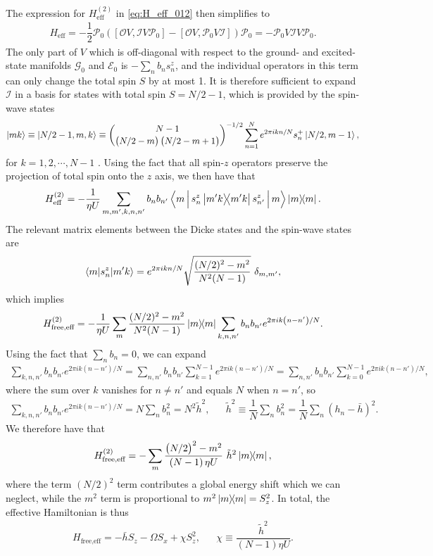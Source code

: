 \documentclass[aps,notitlepage,nofootinbib,11pt]{revtex4-1}
\renewcommand{\t}{\text} %
\newcommand{\f}[2]{\dfrac{#1}{#2}} %
\newcommand{\p}[1]{\left(#1\right)} %
\renewcommand{\sp}[1]{\left[#1\right]} %
\newcommand{\bk}{\braket} %
\newcommand{\Bk}{\Braket} %
\newcommand{\E}{\mathcal{E}}
\newcommand{\G}{\mathcal{G}}
\newcommand{\I}{\mathcal{I}}
\renewcommand{\O}{\mathcal{O}}
\renewcommand{\P}{\mathcal{P}}
\newcommand{\1}{\mathds{1}}
\begin{document}
The expression for $H_{\t{eff}}^{(2)}$ in \eqref{eq:H_eff_012} then
simplifies to
\begin{align}
  H_{\t{eff}}
  = -\f12 \P_0 \p{\sp{\O V, \I V \P_0} - \sp{\O V, \P_0 V \I}} \P_0
  = -\P_0 V \I V \P_0.
\end{align}
The only part of $V$ which is off-diagonal with respect to the ground-
and excited-state manifolds $\G_0$ and $\E_0$ is $-\sum_nb_ns_n^z$,
and the individual operators in this term can only change the total
spin $S$ by at most 1.  It is therefore sufficient to expand $\I$ in a
basis for states with total spin $S=N/2-1$, which is provided by the
spin-wave states
\begin{align}
  \ket{mk}
  \equiv \ket{N/2-1,m,k}
  \equiv {N-1 \choose \p{N/2-m}\p{N/2-m+1}}^{-1/2}
  \sum_{n=1}^N e^{2\pi ikn/N} s_n^+ \ket{N/2,m-1},
\end{align}
for $k=1,2,\cdots,N-1$ \cite{swallows2011suppression}.  Using the fact that all spin-$z$ operators preserve the projection of total spin onto the $z$ axis, we then have that
\begin{align}
  H_{\t{eff}}^{(2)}
  = -\f1{\eta U} \sum_{m,m',k,n,n'} b_n b_{n'}
  \Bk{m| s_n^z \op{m'k} s_{n'}^z |m} \op{m}.
  \label{eq:general_H_eff_2}
\end{align}
The relevant matrix elements between the Dicke states and the
spin-wave states are \cite{swallows2011suppression}
\begin{align}
  \bk{m|s_n^z|m'k}
  = e^{2\pi i k n/N} \sqrt{\f{(N/2)^2-m^2}{N^2 (N-1)}}~ \delta_{m,m'},
\end{align}
which implies
\begin{align}
  H_{\t{free,eff}}^{(2)}
  = -\f1{\eta U} \sum_m \f{(N/2)^2-m^2}{N^2 (N-1)} \op{m}
  \sum_{k,n,n'} b_n b_{n'} e^{2\pi ik\p{n-n'}/N}.
\end{align}
Using the fact that $\sum_nb_n=0$, we can expand
\begin{align}
  \sum_{k,n,n'} b_n b_{n'} e^{2\pi ik\p{n-n'}/N}
  = \sum_{n,n'} b_n b_{n'} \sum_{k=1}^{N-1} e^{2\pi ik\p{n-n'}/N}
  = \sum_{n,n'} b_n b_{n'} \sum_{k=0}^{N-1} e^{2\pi ik\p{n-n'}/N},
\end{align}
where the sum over $k$ vanishes for $n\ne n'$ and equals $N$ when
$n=n'$, so
\begin{align}
  \sum_{k,n,n'} b_n b_{n'} e^{2\pi ik\p{n-n'}/N}
  = N \sum_n b_n^2 = N^2 \tilde h^2,
  &&
  \tilde h^2 \equiv \f1N \sum_n b_n^2 = \f1N \sum_n \p{h_n - \bar h}^2.
  \label{eq:sum_knn}
\end{align}
We therefore have that
\begin{align}
  H_{\t{free,eff}}^{(2)}
  = -\sum_m \f{\p{N/2}^2-m^2}{\p{N-1}\eta U}~ \tilde h^2 \op{m},
\end{align}
where the term $\p{N/2}^2$ term contributes a global energy shift
which we can neglect, while the $m^2$ term is proportional to
$m^2\op{m}=S_z^2$.  In total, the effective Hamiltonian is thus
\begin{align}
  H_{\t{free,eff}} = - \bar h S_z - \Omega S_x + \chi S_z^2,
  &&
  \chi \equiv \f{\tilde h^2}{\p{N-1}\eta U}.
\end{align}


\end{document}
